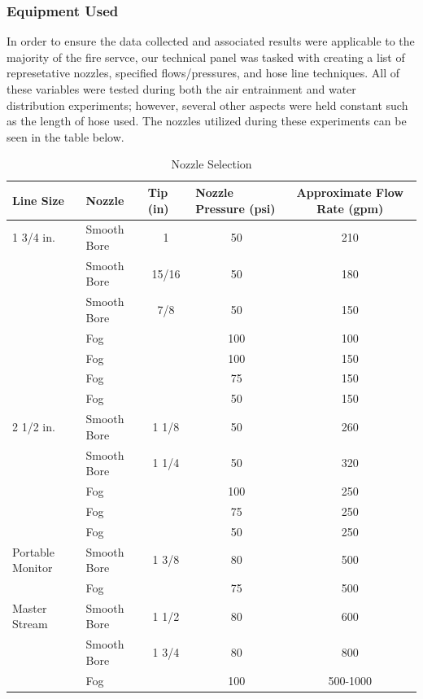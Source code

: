 \documentclass{article}
\begin{document}
\subsubsection{Equipment Used}

In order to ensure the data collected and associated results were applicable to the majority of the fire servce, our technical panel was tasked with creating a list of represetative nozzles, specified flows/pressures, and hose line techniques. All of these variables were tested during both the air entrainment and water distribution experiments; however, several other aspects were held constant such as the length of hose used. The nozzles utilized during these experiments can be seen in the table below.

\begin{table}[]
\centering
\begin{tabular}{|llccc|}
\hline
\multicolumn{1}{|l|}{\textbf{Line Size}} & \multicolumn{1}{l|}{\textbf{Nozzle}} & \multicolumn{1}{l|}{\textbf{Tip (in)}} & \multicolumn{1}{l|}{\textbf{Nozzle Pressure (psi)}} & \textbf{Approximate Flow Rate (gpm)} \\ \hline
1 3/4 in. & Smooth Bore & 1 & 50 & 210 \\
 & Smooth Bore & 15/16 & 50 & 180 \\
 & Smooth Bore & 7/8 & 50 & 150 \\
 & Fog &  & 100 & 100 \\
 & Fog &  & 100 & 150 \\
 & Fog &  & 75 & 150 \\
 & Fog &  & 50 & 150 \\ \hline
2 1/2 in. & Smooth Bore & 1 1/8 & 50 & 260 \\
 & Smooth Bore & 1 1/4 & 50 & 320 \\
 & Fog &  & 100 & 250 \\
 & Fog &  & 75 & 250 \\
 & Fog &  & 50 & 250 \\ \hline
Portable Monitor & Smooth Bore & 1 3/8 & 80 & 500 \\
 & Fog &  & 75 & 500 \\ \hline
Master Stream & Smooth Bore & 1 1/2 & 80 & 600 \\
 & Smooth Bore & 1 3/4 & 80 & 800 \\
 & Fog &  & 100 & 500-1000 \\ \hline
\end{tabular}
\caption{Nozzle Selection}
\label{Nozzle Selection}
\end{table}
\end{document}
